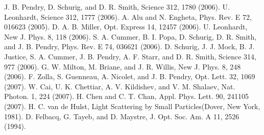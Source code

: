 \documentclass[a4paper, 12pt]{article}
\begin{document}
\begin{thebibliography}{99}
J. B. Pendry, D. Schurig, and D. R. Smith, Science 312, 1780 (2006).
U. Leonhardt, Science 312, 1777 (2006).
A. Alu and N. Engheta, Phys. Rev. E 72, 016623 (2005).
D. A. B. Miller, Opt. Express 14, 12457 (2006).
U. Leonhardt, New J. Phys. 8, 118 (2006).
S. A. Cummer, B. I. Popa, D. Schurig, D. R. Smith, and J. B. Pendry, Phys. Rev. E 74, 036621 (2006).
D. Schurig, J. J. Mock, B. J. Justice, S. A. Cummer, J. B. Pendry, A. F. Starr, and D. R. Smith, 
Science 314, 977 (2006).
G. W. Milton, M. Briane, and J. R. Willis, New J. Phys. 8, 248 (2006).
F. Zolla, S. Guenneau, A. Nicolet, and J. B. Pendry, Opt. Lett. 32, 1069 (2007).
W. Cai, U. K. Chettiar, A. V. Kildishev, and V. M. Shalaev, Nat. Photon. 1, 224 (2007).
H. Chen and C. T. Chan, Appl. Phys. Lett. 90, 241105 (2007).
H. C. van de Hulst, Light Scattering by Small Particles(Dover, New York, 1981).
D. Felbacq, G. Tayeb, and D. Maystre, J. Opt. Soc. Am. A 11, 2526 (1994).
\end{thebibliography}
\end{document}
